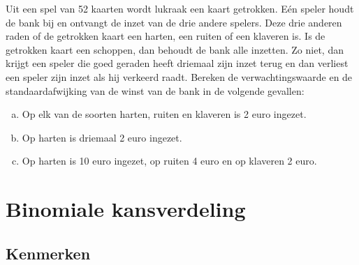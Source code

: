 \documentclass[a4paper,12pt, twoside]{article}
\begin{document}
\begin{oefening}
Uit een spel van 52 kaarten wordt lukraak een kaart getrokken. Eén speler houdt de bank bij en ontvangt de inzet van de drie andere spelers. Deze drie anderen raden of de getrokken kaart een harten, een ruiten of een klaveren is. Is de getrokken kaart een schoppen, dan behoudt de bank alle inzetten. Zo niet, dan krijgt een speler die goed geraden heeft driemaal zijn inzet terug en dan verliest een speler zijn inzet als hij verkeerd raadt. Bereken de verwachtingswaarde en de standaardafwijking van de winst van de bank in de volgende gevallen:

\begin{enumerate}[(a)]
  \item Op elk van de soorten harten, ruiten en klaveren is 2 euro ingezet.
  \item Op harten is driemaal 2 euro ingezet.
  \item Op harten is 10 euro ingezet, op ruiten 4 euro en op klaveren 2 euro.
\end{enumerate}
\end{oefening}



\pagebreak
\section{Binomiale kansverdeling}

\subsection{Kenmerken}
\end{document}
